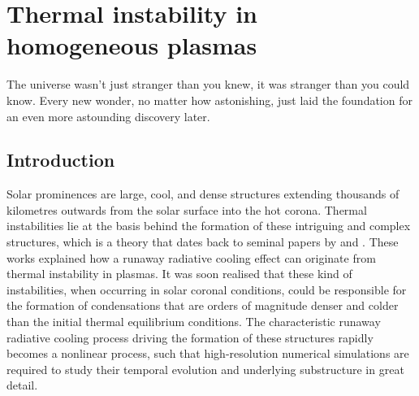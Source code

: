 \chapter{Thermal instability in homogeneous plasmas} \label{ch: thermal instability}

\graphicspath{{03-thermal_instability/figures/}}

\begin{chapterquote}
  The universe wasn't just stranger than you knew, it was stranger than you could know. Every new wonder, no matter how astonishing, just laid the foundation for an even more astounding discovery later.
\end{chapterquote}



\section{Introduction}
Solar prominences are large, cool, and dense structures extending thousands of kilometres outwards from the solar surface into the hot corona. Thermal instabilities lie at the basis behind the formation of these intriguing and complex structures, which is a theory that dates back to seminal papers by \citet{parker1953} and \citet{field1965}. These works explained how a runaway radiative cooling effect can originate from thermal instability in plasmas. It was soon realised \citep{priest1979} that these kind of instabilities, when occurring in solar coronal conditions, could be responsible for the formation of condensations that are orders of magnitude denser and colder than the initial thermal equilibrium conditions. The characteristic runaway radiative cooling process driving the formation of these structures rapidly becomes a nonlinear process, such that high-resolution numerical simulations are required to study their temporal evolution and underlying substructure in great detail.

